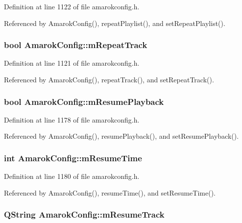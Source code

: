 Definition at line 1122 of file amarokconfig.h.

Referenced by Amarok\-Config(), repeat\-Playlist(), and set\-Repeat\-Playlist().
\subsubsection{\setlength{\rightskip}{0pt plus 5cm}bool {\bf Amarok\-Config::m\-Repeat\-Track}\hspace{0.3cm}{\tt  [protected]}}\label{classAmarokConfig_AmarokConfigp7}




Definition at line 1121 of file amarokconfig.h.

Referenced by Amarok\-Config(), repeat\-Track(), and set\-Repeat\-Track().
\subsubsection{\setlength{\rightskip}{0pt plus 5cm}bool {\bf Amarok\-Config::m\-Resume\-Playback}\hspace{0.3cm}{\tt  [protected]}}\label{classAmarokConfig_AmarokConfigp54}




Definition at line 1178 of file amarokconfig.h.

Referenced by Amarok\-Config(), resume\-Playback(), and set\-Resume\-Playback().
\subsubsection{\setlength{\rightskip}{0pt plus 5cm}int {\bf Amarok\-Config::m\-Resume\-Time}\hspace{0.3cm}{\tt  [protected]}}\label{classAmarokConfig_AmarokConfigp56}




Definition at line 1180 of file amarokconfig.h.

Referenced by Amarok\-Config(), resume\-Time(), and set\-Resume\-Time().
\subsubsection{\setlength{\rightskip}{0pt plus 5cm}QString {\bf Amarok\-Config::m\-Resume\-Track}\hspace{0.3cm}{\tt  [protected]}}\label{classAmarokConfig_AmarokConfigp55}




